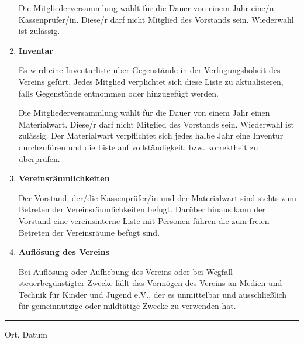 \documentclass{article}
\begin{document}
\begin{enumerate}[\textsection  1.]
	Die Mitgliederversammlung wählt für die Dauer von einem Jahr eine/n Kassenprüfer/in.
	Diese/r darf nicht Mitglied des Vorstands sein.
	Wiederwahl ist zulässig.
	
\newpage

\item \textsf{\textbf{Inventar}}

	Es wird eine Inventurliste über Gegenstände in der Verfügungshoheit des Vereins gefürt. Jedes Mitglied verplichtet sich diese Liste zu aktualisieren, falls Gegenstände entnommen oder hinzugefügt werden. 
	
	Die Mitgliederversammlung  wählt für die Dauer von einem Jahr einen Materialwart. Diese/r darf nicht Mitglied des Vorstands sein. Wiederwahl ist zulässig. 
	Der Materialwart verpflichtet sich jedes halbe Jahr eine Inventur durchzufüren und die Liste auf vollständigkeit, bzw. korrektheit zu überprüfen.
	

\item \textsf{\textbf{Vereinsräumlichkeiten}}

	Der Vorstand, der/die Kassenprüfer/in und der Materialwart sind stehts zum Betreten der Vereinsräumlichkeiten befugt. Darüber hinaus kann der Vorstand eine vereinsinterne Liste mit Personen führen die zum freien Betreten der Vereinsräume befugt sind.

\item \textsf{\textbf{Auflösung des Vereins}}

	Bei Auflösung oder Aufhebung des Vereins oder bei Wegfall steuerbegünstigter Zwecke fällt
	das Vermögen des Vereins an Medien und Technik für Kinder und Jugend e.V., der es unmittelbar und ausschließlich
	für gemeinnützige oder mildtätige Zwecke zu verwenden hat. 
	
	
	\begin{comment}
	Anmerkung:
	In einer Vereinssatzung müssen als wesentlicher Bestandteil enthalten sein (in der Mustersatzung
	durch fette Schrift hervorgehoben):
	Bestimmungen über den Namen, Sitz und Zweck des Vereins und darüber, dass er in
	das Vereinsregister eingetragen werden soll (in der Mustersatzung: § 1, § 3 zweiter
	Gliederungspunkt),
	Bestimmungen über Eintritt und Austritt der Mitglieder (in der Mustersatzung: §§ 7, 8),
	Bestimmungen darüber, ob und welche Beiträge die Mitglieder zu leisten haben (in der
	Mustersatzung: § 9),
	Bestimmungen über die Bildung des vertretungsberechtigten Vorstandes (in der Mustersatzung:
	§ 12 erster Gliederungspunkt),
	Bestimmungen über die Voraussetzungen, unter denen eine Mitgliederversammlung
	einzuberufen ist, über die Form der Einberufung und über die Beurkundung der Beschlüsse
	der Mitgliederversammlung (in der Mustersatzung: § 11 zweiter und dritter
	Gliederungspunkt, vierter Gliederungspunkt Satz 1, letzter Gliederungspunkt),
	das Datum der Errichtung.
	5
	Die Satzung eines gemeinnützigen Vereins muss aus steuerrechtlichen Gründen auch die in
	kursiver Schrift wiedergegebenen Festlegungen der Mustersatzung (§§ 3, 4, 5, 6, 14) enthalten
	(§ 60 Abs. 1 der Abgabenordnung).
	\end{comment}
	
\end{enumerate}
\vfill
\begin{minipage}{5cm}
\hrule\hfill
\newline
\vspace{0.5cm}
\centering Ort, Datum
\end{minipage}
\end{document}
